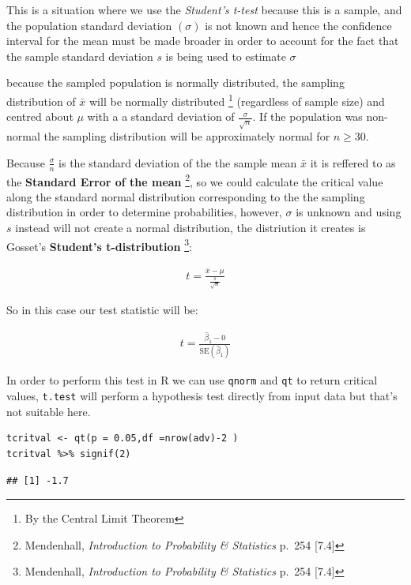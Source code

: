 \documentclass[11pt]{article}
\begin{document}
\begin{enumerate}
\begin{enumerate}
This is a situation where we use the \emph{Student's t-test} because this is
a sample, and the population standard deviation \(\left( \sigma \right)\)
is not known and hence the confidence interval for the mean must be made
broader in order to account for the fact that the sample standard
deviation \(s\) is being used to estimate \(\sigma\)

because the sampled population is normally distributed, the sampling
distribution of \(\bar{x}\) will be normally distributed \footnote{By the Central Limit Theorem}
(regardless of sample size) and centred about \(\mu\) with a a standard
deviation of \(\frac{\sigma}{\sqrt{n}}\). If the population was non-normal
the sampling distribution will be approximately normal for \(n\geq 30\).

Because \(\frac{\sigma}{n}\) is the standard deviation of the the sample
mean \(\bar{x}\) it is reffered to as the \textbf{Standard Error of the
mean} \footnote{Mendenhall, \emph{Introduction to Probability \& Statistics} p. 254
[7.4]}, so we could calculate the critical value along the
standard normal distribution corresponding to the the sampling
distribution in order to determine probabilities, however, \(\sigma\) is
unknown and using \(s\) instead will not create a normal distribution, the
distriution it creates is Gosset's \textbf{Student's t-distribution} \footnote{Mendenhall, \emph{Introduction to Probability \& Statistics} p. 254
[7.4]}:

\begin{align}
  t = \frac{\overline{x}- \mu}{\frac{s}{\sqrt{n}}}
\end{align}

So in this case our test statistic will be:

\begin{align}
t = \frac{\hat{\beta}_1- 0}{\text{SE}\left( \hat{\beta}_1 \right)}
\end{align}

In order to perform this test in R we can use \texttt{qnorm} and \texttt{qt} to return
critical values, \texttt{t.test} will perform a hypothesis test directly from
input data but that's not suitable here.

\begin{verbatim}
tcritval <- qt(p = 0.05,df =nrow(adv)-2 )
tcritval %>% signif(2)
\end{verbatim}

\begin{verbatim}
## [1] -1.7
\end{verbatim}


\end{enumerate}
\end{enumerate}
\end{document}
